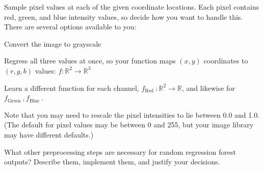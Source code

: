 \documentclass[10pt, a4paper]{article}
\begin{document}
\begin{Problem*}
Sample pixel values at each of the given coordinate locations. Each pixel contains red, green, and blue intensity values, so decide how you want to handle this. \\
There are several options available to you:
  \item Convert the image to grayscale

  \item Regress all three values at once, so your function maps $(x, y)$ coordinates to $(r, g, b)$ values: $f: \mathbb{R}^{2} \rightarrow \mathbb{R}^{3}$

  \item Learn a different function for each channel, $f_{\text {Red }}: \mathbb{R}^{2} \rightarrow \mathbb{R}$, and likewise for $f_{\text {Green }}, f_{\text {Blue }}$.

Note that you may need to rescale the pixel intensities to lie between 0.0 and 1.0. (The default for pixel values may be between 0 and 255, but your image library may have different defaults.)

What other preprocessing steps are necessary for random regression forest outputs? Describe them, implement them, and justify your decisions.
\end{Problem*}
\end{document}
